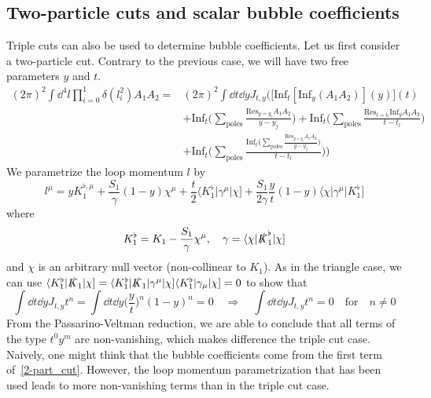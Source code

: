 \subsection*{Two-particle cuts and scalar bubble coefficients}
Triple cuts can also be used to determine bubble coefficients. 
Let us first consider a two-particle cut.
Contrary to the previous case, we will have two free parameters $y$ and $t$.
\begin{equation}\label{2-part_cut}
\begin{split}
(2\pi)^2\int \dd^4 l \prod_{i=0}^1 \delta(l_i^2) A_1 A_2 = & 
(2\pi)^2\int \dd t\dd y J_{t,y}\Big(\big[\mathrm{Inf}_t [\mathrm{Inf}_y(A_1A_2)](y)\big](t) 
\\&
+
\mathrm{Inf}_t\big(\sum_{\textrm{poles}}\frac{\mathrm{Res}_{y = y_i}A_1A_2}{y-y_j})
+
\mathrm{Inf}_t\big(\sum_{\textrm{poles}}\frac{\mathrm{Res}_{t = t_l}\mathrm{Inf}_y A_1A_2}{t-t_l})
\\ &
+
\mathrm{Inf}_t\big(\sum_{\textrm{poles}}\frac{\mathrm{Inf}_t\big(\sum_{\textrm{poles}}\frac{\mathrm{Res}_{y = y_i}A_1A_2}{y-y_j}\big)}{t-t_l}\big)
\Big)
\end{split}
\end{equation}
We parametrize the loop momentum $l$ by
\begin{equation*}
l^\mu = yK_1^{\flat,\mu} + \frac{S_1}{\gamma}(1-y)\chi^\mu + \frac{t}{2}\langle K_1^\flat|\gamma^\mu|\chi] + \frac{S_1}{2\gamma}\frac{y}{t}(1-y)\langle \chi|\gamma^\mu|K_1^\flat]
\end{equation*}
where
\begin{equation*}
K_1^\flat = K_1 - \frac{S_1}{\gamma}\chi^\mu ,\quad
\gamma = \langle \chi | \slashed{K}_1^\flat|\chi]
\end{equation*}
and $\chi$ is an arbitrary null vector (non-collinear to $K_1$).
As in the triangle case, we can use $\langle K_1^\flat| \slashed{K}_1|\chi] = \langle K_1^\flat|\slashed{K}_1 | \gamma^\mu|\chi]\langle K_1^\flat|\gamma_\mu|\chi]= 0$ to show that
\begin{equation*}
\int\dd t\dd y J_{t,y}t^n = \int \dd t \dd y \big(\frac{y}{t}\big)^n(1-y)^n = 0
\quad\Rightarrow\quad
\int \dd t \dd y J_{t,y}t^n = 0
\quad\textrm{for}\quad n\neq 0
\end{equation*} 
From the Passarino-Veltman reduction, we are able to conclude that all terms of the type $t^0y^m$ are non-vanishing, which makes difference \wrt the triple cut case. 
Naively, one might think that the bubble coefficients come from the first term of~\cref{2-part_cut}.
However, the loop momentum parametrization that has been used leads to more non-vanishing terms than in the triple cut case. 
